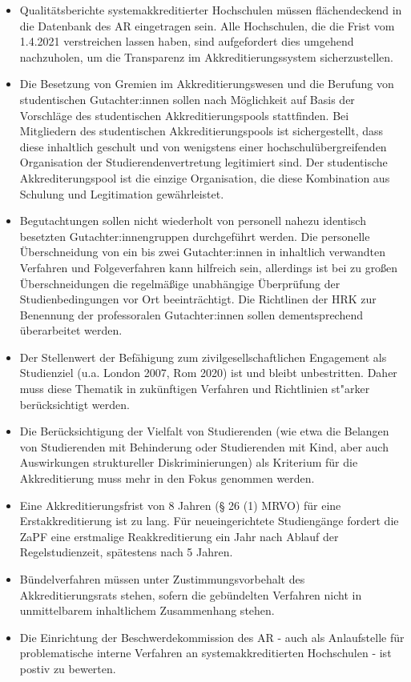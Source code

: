 \documentclass[DIV=calc]{scrartcl}
\let\oldgrqq=\grqq
\def\grqq{\oldgrqq\xspace}
\begin{document}
\begin{itemize}
	\item Qualitätsberichte systemakkreditierter Hochschulen müssen flächendeckend in die Datenbank des AR eingetragen sein. Alle Hochschulen, die die Frist vom 1.4.2021 verstreichen lassen haben, sind aufgefordert dies umgehend nachzuholen, um die Transparenz im Akkreditierungssystem sicherzustellen.
	
	\item Die Besetzung von Gremien im Akkreditierungswesen und die Berufung von studentischen Gutachter:innen sollen nach Möglichkeit auf Basis der Vorschläge des studentischen Akkreditierungspools stattfinden. Bei Mitgliedern des studentischen Akkreditierungspools ist sichergestellt, dass diese inhaltlich geschult und von wenigstens einer hochschulübergreifenden Organisation der Studierendenvertretung legitimiert sind. Der studentische Akkrediterungspool ist die einzige Organisation, die diese Kombination aus Schulung und Legitimation gewährleistet.
	
	\item Begutachtungen sollen nicht wiederholt von personell nahezu identisch besetzten Gutachter:innengruppen durchgeführt werden. Die personelle Überschneidung von ein bis zwei Gutachter:innen in inhaltlich verwandten Verfahren und Folgeverfahren kann hilfreich sein, allerdings ist bei zu großen Überschneidungen die regelmäßige unabhängige Überprüfung der Studienbedingungen vor Ort beeinträchtigt. Die Richtlinen der HRK zur Benennung der professoralen Gutachter:innen sollen dementsprechend überarbeitet werden.
	
	\item Der Stellenwert der \glqq Befähigung zum zivilgesellschaftlichen Engagement\grqq als Studienziel (u.a. London 2007, Rom 2020) ist und bleibt unbestritten. Daher muss diese Thematik in zukünftigen Verfahren und Richtlinien st"arker berücksichtigt werden.
	
	\item Die Berücksichtigung der Vielfalt von Studierenden (wie etwa die Belangen von Studierenden mit Behinderung oder Studierenden mit Kind, aber auch Auswirkungen struktureller Diskriminierungen) als Kriterium für die Akkreditierung muss mehr in den Fokus genommen werden. 
	
	\item Eine Akkreditierungsfrist von 8 Jahren (§ 26 (1) MRVO) für eine Erstakkreditierung ist zu lang. Für neueingerichtete Studiengänge fordert die ZaPF eine erstmalige Reakkreditierung ein Jahr nach Ablauf der Regelstudienzeit, spätestens nach 5 Jahren.
	
	\item Bündelverfahren müssen unter Zustimmungsvorbehalt des Akkreditierungsrats stehen, sofern die gebündelten Verfahren nicht in unmittelbarem inhaltlichem Zusammenhang stehen.
	
	\item Die Einrichtung der Beschwerdekommission des AR - auch als Anlaufstelle für problematische interne Verfahren an systemakkreditierten Hochschulen - ist postiv zu bewerten.
\end{itemize} 
\end{document}
